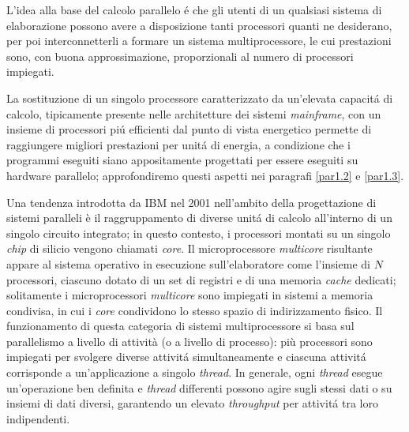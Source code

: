 \nocite{Patterson2022}
L'idea alla base del calcolo parallelo \'e che gli utenti di un qualsiasi sistema di elaborazione possono avere a disposizione tanti processori
quanti ne desiderano, per poi interconnetterli a formare un sistema
multiprocessore, le cui prestazioni sono, con buona approssimazione,
proporzionali al numero di processori impiegati.

La sostituzione di un singolo processore caratterizzato da un'elevata
capacit\'a di calcolo, tipicamente presente nelle architetture dei sistemi
\textit{mainframe}, con un insieme di processori pi\'u efficienti
dal punto di vista energetico permette di raggiungere migliori prestazioni
per unit\'a di energia, a condizione che i programmi eseguiti siano
appositamente progettati per essere eseguiti su hardware parallelo; approfondiremo questi aspetti nei paragrafi \ref{par1.2} e \ref{par1.3}.

Una tendenza introdotta da IBM nel 2001 nell'ambito della progettazione di sistemi paralleli \cite{tendler2001power4} è il raggruppamento
di diverse unit\'a di calcolo all'interno di un singolo circuito integrato; in questo contesto, i processori montati su un singolo \textit{chip} di silicio vengono chiamati \textit{core}.\newline
Il microprocessore \textit{multicore} risultante appare al sistema operativo in esecuzione sull'elaboratore come l'insieme di $N$ processori, ciascuno dotato di un set di registri e di una memoria \textit{cache} dedicati; solitamente i microprocessori \textit{multicore} sono impiegati in sistemi a memoria condivisa, in cui i \textit{core} condividono lo stesso spazio di indirizzamento fisico.\newline
Il funzionamento di questa categoria di sistemi multiprocessore si basa sul parallelismo a livello di attività (o a livello di processo): più
processori sono impiegati per svolgere diverse attivit\'a simultaneamente e ciascuna attivit\'a corrisponde a un'applicazione a singolo
\textit{thread}.\newline
In generale, ogni \textit{thread} esegue un'operazione ben definita e \textit{thread} differenti possono agire sugli stessi
dati o su insiemi di dati diversi, garantendo un elevato \textit{throughput} per attivit\'a tra loro indipendenti.

